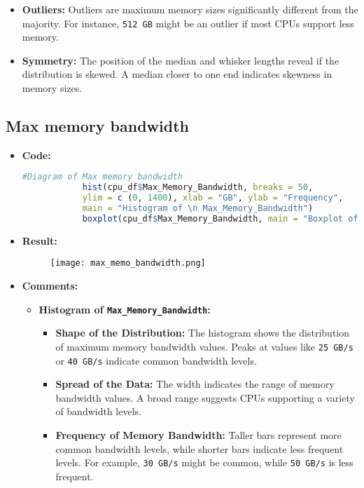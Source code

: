 \documentclass{article}
\begin{document}
\begin{itemize}
\begin{itemize}
\begin{itemize}
				\item \textbf{Outliers:} Outliers are maximum memory sizes significantly different from the majority. For instance, \texttt{512 GB} might be an outlier if most CPUs support less memory.
				\item \textbf{Symmetry:} The position of the median and whisker lengths reveal if the distribution is skewed. A median closer to one end indicates skewness in memory sizes.
			\end{itemize}
		\end{itemize}
	\end{itemize}
	\subsection{Max memory bandwidth}
	\begin{itemize}
		\item \textbf{Code:}
		\begin{lstlisting}[basicstyle=\ttfamily, frame=single,language=R]
			#Diagram of Max memory bandwidth
			hist(cpu_df$Max_Memory_Bandwidth, breaks = 50, 
			ylim = c (0, 1400), xlab = "GB", ylab = "Frequency",
			main = "Histogram of \n Max_Memory_Bandwidth")
			boxplot(cpu_df$Max_Memory_Bandwidth, main = "Boxplot of \n Max_Memory_Bandwidth")
		\end{lstlisting}
		\item \textbf{Result:}
		\begin{figure}[h]
			\centering
			\texttt{[image: max\_memo\_bandwidth.png]} %
			\label{fig:enter-label}
		\end{figure}
		\item \textbf{Comments:}
		\begin{itemize}
			\item \textbf{Histogram of \texttt{Max\_Memory\_Bandwidth}:}
			\begin{itemize}
				\item \textbf{Shape of the Distribution:} The histogram shows the distribution of maximum memory bandwidth values. Peaks at values like \texttt{25 GB/s} or \texttt{40 GB/s} indicate common bandwidth levels.
				\item \textbf{Spread of the Data:} The width indicates the range of memory bandwidth values. A broad range suggests CPUs supporting a variety of bandwidth levels.
				\item \textbf{Frequency of Memory Bandwidth:} Taller bars represent more common bandwidth levels, while shorter bars indicate less frequent levels. For example, \texttt{30 GB/s} might be common, while \texttt{50 GB/s} is less frequent.

\end{itemize}
\end{itemize}
\end{itemize}
\end{document}
